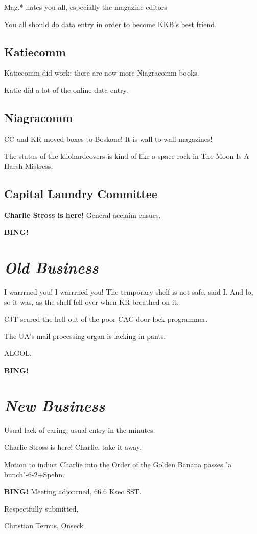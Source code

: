 \documentclass[10pt]{article}
\newcommand{\bing}{{\bf BING!} }
\newcommand{\goto}[1]{\bing \vskip 12pt \section*{{\em{#1}}}}
\begin{document}
Mag.* hates you all, especially the magazine editors

You all should do data entry in order to become KKB's best friend.

\subsection*{Katiecomm}

Katiecomm did work; there are now more Niagracomm books.

Katie did a lot of the online data entry.

\subsection*{Niagracomm}

CC and KR moved boxes to Boskone!  It is wall-to-wall magazines!

The status of the kilohardcovers is kind of like a space rock in The Moon Is A Harsh Mistress.

\subsection*{Capital Laundry Committee}

\textbf{Charlie Stross is here!}  General acclaim ensues.

\goto{Old Business}

I warrrned you!  I warrrned you!  The temporary shelf is not safe, said I.  And lo, so it was, as the shelf fell over when KR breathed on it.

CJT scared the hell out of the poor CAC door-lock programmer.

The UA's mail processing organ is lacking in pants.

ALGOL.

\goto{New Business}

Usual lack of caring, usual entry in the minutes.

Charlie Stross is here!  Charlie, take it away.

Motion to induct Charlie into the Order of the Golden Banana passes "a bunch"-6-2+Spehn.

\bing
\noindent
Meeting adjourned, 66.6 Ksec SST.

\vspace{18pt}

\centerline{Respectfully submitted,}
\centerline{Christian Ternus, Onseck}
\end{document}
